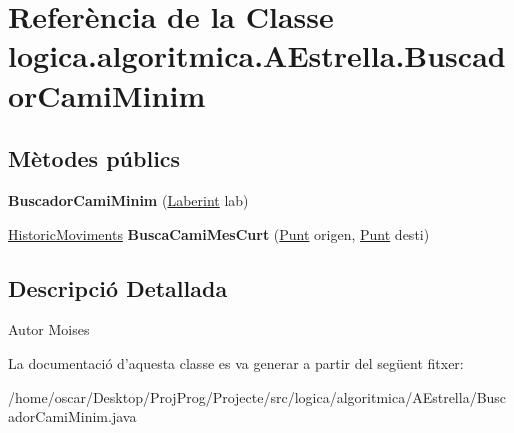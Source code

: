 \hypertarget{classlogica_1_1algoritmica_1_1_a_estrella_1_1_buscador_cami_minim}{\section{Referència de la Classe logica.\+algoritmica.\+A\+Estrella.\+Buscador\+Cami\+Minim}
\label{classlogica_1_1algoritmica_1_1_a_estrella_1_1_buscador_cami_minim}
}
\subsection*{Mètodes públics}
\begin{DoxyCompactItemize}
\item 
\hypertarget{classlogica_1_1algoritmica_1_1_a_estrella_1_1_buscador_cami_minim_aa83d350da116b2748bbd714081720017}{{\bfseries Buscador\+Cami\+Minim} (\hyperlink{classlogica_1_1laberints_1_1_laberint}{Laberint} lab)}\label{classlogica_1_1algoritmica_1_1_a_estrella_1_1_buscador_cami_minim_aa83d350da116b2748bbd714081720017}

\item 
\hypertarget{classlogica_1_1algoritmica_1_1_a_estrella_1_1_buscador_cami_minim_a81b249707afe69016f7979698cf38bf8}{\hyperlink{classlogica_1_1historic__moviments_1_1_historic_moviments}{Historic\+Moviments} {\bfseries Busca\+Cami\+Mes\+Curt} (\hyperlink{classlogica_1_1_punt}{Punt} origen, \hyperlink{classlogica_1_1_punt}{Punt} desti)}\label{classlogica_1_1algoritmica_1_1_a_estrella_1_1_buscador_cami_minim_a81b249707afe69016f7979698cf38bf8}

\end{DoxyCompactItemize}


\subsection{Descripció Detallada}
\begin{DoxyAuthor}{Autor}
Moises 
\end{DoxyAuthor}


La documentació d'aquesta classe es va generar a partir del següent fitxer\+:\begin{DoxyCompactItemize}
\item 
/home/oscar/\+Desktop/\+Proj\+Prog/\+Projecte/src/logica/algoritmica/\+A\+Estrella/Buscador\+Cami\+Minim.\+java\end{DoxyCompactItemize}
